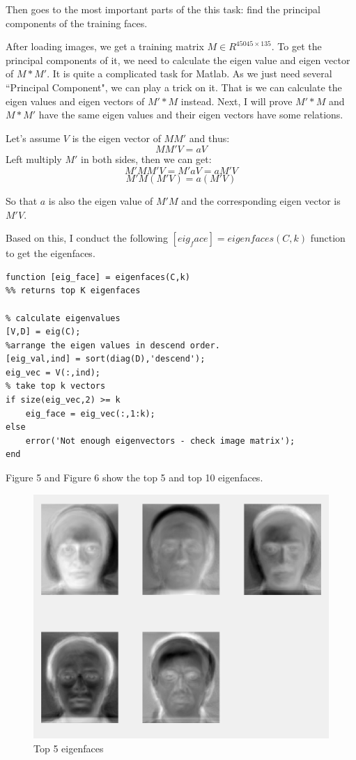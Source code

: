 \documentclass{article}
\begin{document}
Then goes to the most important parts of the this task: find the principal components of the training faces.

After loading images, we get a training matrix $M\in R^{45045\times 135}$. To get the principal components of it, we need to calculate the eigen value and eigen vector of $M*M'$. It is quite a complicated task for Matlab. As we just need several ``Principal Component", we can play a trick on it. That is we can calculate the eigen values and eigen vectors of $M'*M$ instead. Next, I will prove $M'*M$ and $M*M'$ have the same eigen values and their eigen vectors have some relations.

Let's assume $V$ is the eigen vector of $MM'$ and thus:
$$MM'V = aV$$
Left multiply $M'$ in both sides, then we can get:
$$M'MM'V = M'aV = aM'V $$
$$M'M(M'V) = a(M'V)$$

So that $a$ is also the eigen value of $M'M$ and the corresponding eigen vector is $M'V$. 

Based on this, I conduct the following $[eig_face] = eigenfaces(C,k)$ function to get the eigenfaces.

\begin{lstlisting}
function [eig_face] = eigenfaces(C,k)
%% returns top K eigenfaces

% calculate eigenvalues
[V,D] = eig(C);
%arrange the eigen values in descend order.
[eig_val,ind] = sort(diag(D),'descend');
eig_vec = V(:,ind);
% take top k vectors
if size(eig_vec,2) >= k
    eig_face = eig_vec(:,1:k);
else
    error('Not enough eigenvectors - check image matrix');
end
\end{lstlisting}

Figure 5 and Figure 6 show the top 5 and top 10 eigenfaces.

\begin{figure}[htbp]
    \centering
    \includegraphics[scale = 0.4]{5.png}
    \caption{Top 5 eigenfaces}
    \label{fig5}
\end{figure}
\end{document}
